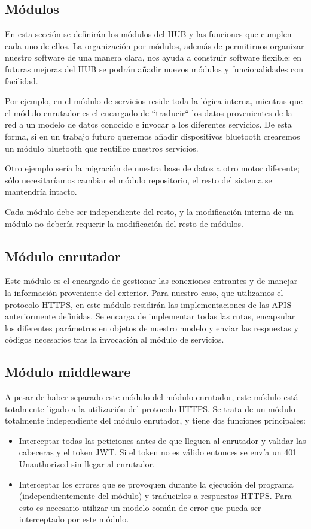 \subsection{Módulos}
En esta sección se definirán los módulos del HUB y las funciones que cumplen cada uno de ellos. La organización por módulos, además
de permitirnos organizar nuestro software de una manera clara, nos ayuda a construir software flexible: en futuras mejoras del HUB se podrán añadir
nuevos módulos y funcionalidades con facilidad.
\par
Por ejemplo, en el módulo de servicios reside toda la lógica interna, mientras que el módulo enrutador es el encargado de ``traducir`` los datos
provenientes de la red a un modelo de datos conocido e invocar a los diferentes servicios. De esta forma, si en un trabajo futuro queremos añadir
dispositivos bluetooth crearemos un módulo bluetooth que reutilice nuestros servicios.
\par
Otro ejemplo sería la migración de nuestra base de datos a otro motor diferente; sólo necesitaríamos cambiar el módulo repositorio, el resto del sistema
se mantendría intacto.
\par
Cada módulo debe ser independiente del resto, y la modificación interna de un módulo no debería requerir la modificación del resto de módulos.
\subsection{Módulo enrutador}
Este módulo es el encargado de gestionar las conexiones entrantes y de manejar la información proveniente del exterior. Para nuestro caso, que utilizamos
el protocolo HTTPS, en este módulo residirán las implementaciones de las APIS anteriormente definidas. Se encarga de implementar todas las rutas, encapsular
los diferentes parámetros en objetos de nuestro modelo y enviar las respuestas y códigos necesarios tras la invocación al módulo de servicios.
\subsection{Módulo middleware}
A pesar de haber separado este módulo del módulo enrutador, este módulo está totalmente ligado a la utilización del protocolo HTTPS. 
Se trata de un módulo totalmente independiente del módulo enrutador, y tiene dos funciones principales:
\begin{itemize}
\setlength\itemsep{6pt plus 1pt minus 1pt}
\item Interceptar todas las peticiones antes de que lleguen al enrutador y validar las cabeceras y el token JWT. Si el token no es válido entonces
se envía un 401 Unauthorized sin llegar al enrutador.
\item Interceptar los errores que se provoquen durante la ejecución del programa (independientemente del módulo) y traducirlos a respuestas HTTPS. Para esto 
es necesario utilizar un modelo común de error que pueda ser interceptado por este módulo.
\end{itemize}
